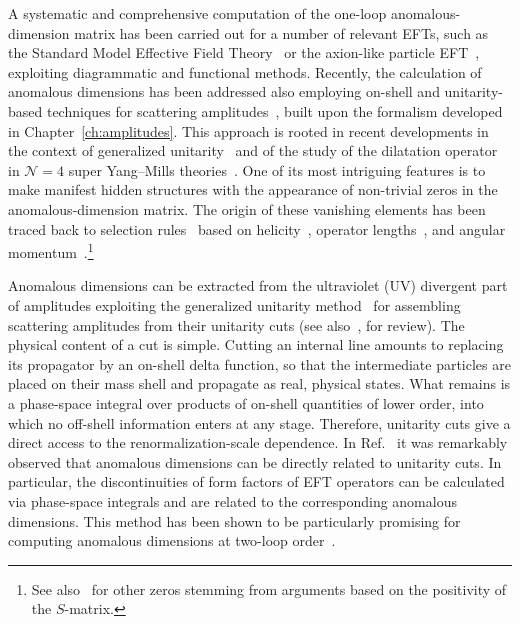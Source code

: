 A systematic and comprehensive computation of the one-loop anomalous-dimension matrix has been
carried out for a number of relevant EFTs, such as the Standard Model Effective Field Theory~\cite{Jenkins:2013zja,Jenkins:2013wua,Alonso:2013hga,Jenkins:2017dyc} or the axion-like
particle EFT~\cite{Bauer:2020jbp,Chala:2020wvs}, exploiting diagrammatic and functional methods.
Recently, the calculation of anomalous dimensions has been addressed also employing on-shell and
unitarity-based techniques for scattering
amplitudes~\cite{Caron-Huot:2016cwu,EliasMiro:2020tdv,Baratella:2020lzz,Jiang:2020mhe,Bern:2020ikv,Baratella:2020dvw,AccettulliHuber:2021uoa,EliasMiro:2021jgu,Baratella:2022nog,Machado:2022ozb,Wu:2025qto,Baratella:2021guc,Shu:2021qlr,Ma:2019gtx,Panico:2018hal},
built upon the formalism developed in Chapter~\ref{ch:amplitudes}. This approach is rooted in recent
developments in the context of generalized
unitarity~\cite{Arkani-Hamed:2008owk,Huang:2012aq,Cheung:2015aba} and of the study of the dilatation
operator in $\mathcal N=4$ super Yang--Mills
theories~\cite{Zwiebel:2011bx,Wilhelm:2014qua,Nandan:2014oga,Koster:2014fva,Brandhuber:2014pta,Brandhuber:2015boa,Loebbert:2015ova,Brandhuber:2016fni}. One of its most intriguing features is to
make manifest hidden structures with the appearance of non-trivial zeros in the anomalous-dimension
matrix. The origin of these vanishing elements has been traced back to selection
rules~\cite{Elias-Miro:2014eia} based on helicity~\cite{Cheung:2015aba}, operator
lengths~\cite{Bern:2019wie}, and angular momentum~\cite{Jiang:2020rwz}.\footnote{See
also~\cite{Chala:2023jyx,Chala:2023xjy} for other zeros stemming from arguments based on the
positivity of the $S$-matrix.}

Anomalous dimensions can be extracted from the ultraviolet (UV) divergent part of amplitudes exploiting
the generalized unitarity
method~\cite{Bern:1994zx,Bern:1994cg,Britto:2004nc,Britto:2005ha,Britto:2006sj,Mastrolia:2009dr} for
assembling scattering amplitudes from their unitarity cuts (see also~\cite{Ellis:2011cr}, for
review). The physical content of a cut is simple. Cutting an internal line amounts to replacing its
propagator by an on-shell delta function, so that the intermediate particles are placed on their mass
shell and propagate as real, physical states. What remains is a phase-space integral over products of
on-shell quantities of lower order, into which no off-shell information enters at any stage.
Therefore, unitarity cuts give a direct access to the renormalization-scale dependence. In
Ref.~\cite{Caron-Huot:2016cwu} it was remarkably observed that anomalous dimensions can be directly
related to unitarity cuts. In particular, the discontinuities of form factors of EFT operators can be
calculated via phase-space integrals and are related to the corresponding anomalous dimensions. This
method has been shown to be particularly promising for computing anomalous dimensions at two-loop
order~\cite{Bern:2020ikv}.

